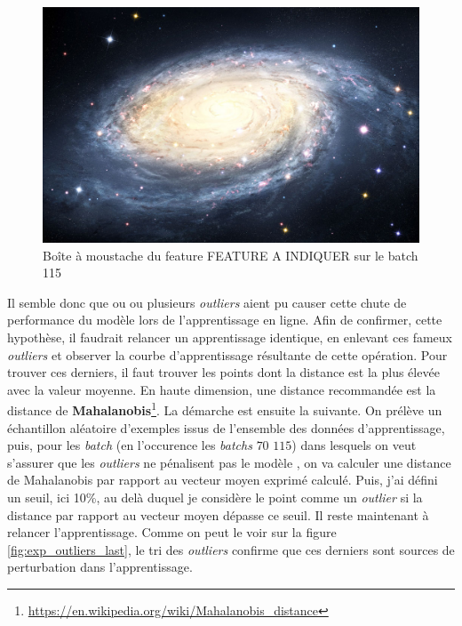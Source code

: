         \begin{figure}[h]
            \includegraphics[width=\linewidth]{images/universe.jpg}
            \caption{Boîte à moustache du feature FEATURE A INDIQUER sur le batch 115}
            \label{fig:box-plot-train-115}
        \end{figure}
        Il semble donc que ou ou plusieurs \emph{outliers} aient pu causer cette chute de performance du modèle lors de l'apprentissage en ligne. Afin de confirmer, cette hypothèse, il faudrait relancer un apprentissage identique, en enlevant ces fameux \emph{outliers} et observer la courbe d'apprentissage résultante de cette opération. Pour trouver ces derniers, il faut trouver les points dont la distance est la plus élevée avec la valeur moyenne. En haute dimension, une distance recommandée est la distance de \textbf{Mahalanobis}\footnote{\url{https://en.wikipedia.org/wiki/Mahalanobis_distance}}. La démarche est ensuite la suivante. On prélève un échantillon aléatoire d'exemples issus de l'ensemble des données d'apprentissage, puis, pour les \emph{batch} (en l'occurence les \emph{batchs} $70$ $115$) dans lesquels on veut s'assurer que les \emph{outliers}  ne pénalisent pas le modèle , on va calculer une distance de Mahalanobis par rapport au vecteur moyen exprimé calculé. Puis, j'ai défini un seuil, ici 10\%, au delà duquel je considère le point comme un \emph{outlier} si la distance par rapport au vecteur moyen dépasse ce seuil. Il reste maintenant à relancer l'apprentissage. Comme on peut le voir sur la figure \ref{fig:exp_outliers_last}, le tri des \emph{outliers} confirme que ces derniers sont sources de perturbation dans l'apprentissage. 
